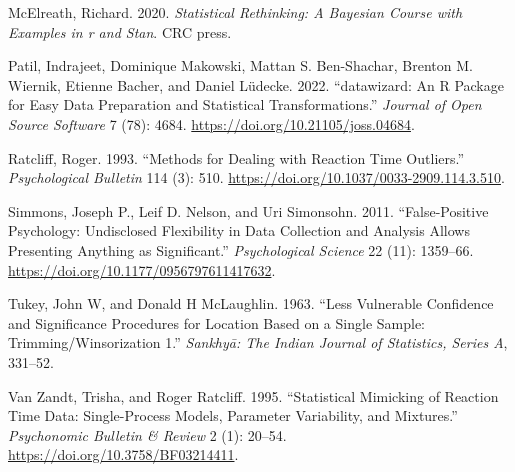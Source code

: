 \documentclass{article}
\newlength{\cslhangindent}
\newlength{\cslentryspacingunit} %
\newenvironment{CSLReferences}[2] %
 {%
  \setlength{\parindent}{0pt}
  \ifodd #1
  \let\oldpar\par
  \def\par{\hangindent=\cslhangindent\oldpar}
  \fi
  \setlength{\parskip}{#2\cslentryspacingunit}
 }%
 {}
\begin{document}
\begin{CSLReferences}{1}{0}
\leavevmode{}%
McElreath, Richard. 2020. \emph{Statistical Rethinking: A Bayesian
Course with Examples in r and Stan}. CRC press.

\leavevmode{}%
Patil, Indrajeet, Dominique Makowski, Mattan S. Ben-Shachar, Brenton M.
Wiernik, Etienne Bacher, and Daniel Lüdecke. 2022. {``{datawizard}: An
{R} Package for Easy Data Preparation and Statistical
Transformations.''} \emph{Journal of Open Source Software} 7 (78): 4684.
\url{https://doi.org/10.21105/joss.04684}.

\leavevmode{}%
Ratcliff, Roger. 1993. {``Methods for Dealing with Reaction Time
Outliers.''} \emph{Psychological Bulletin} 114 (3): 510.
\url{https://doi.org/10.1037/0033-2909.114.3.510}.

\leavevmode{}%
Simmons, Joseph P., Leif D. Nelson, and Uri Simonsohn. 2011.
{``False-Positive Psychology: Undisclosed Flexibility in Data Collection
and Analysis Allows Presenting Anything as Significant.''}
\emph{Psychological Science} 22 (11): 1359--66.
\url{https://doi.org/10.1177/0956797611417632}.

\leavevmode{}%
Tukey, John W, and Donald H McLaughlin. 1963. {``Less Vulnerable
Confidence and Significance Procedures for Location Based on a Single
Sample: Trimming/Winsorization 1.''} \emph{Sankhy{ā}: The Indian Journal
of Statistics, Series A}, 331--52.

\leavevmode{}%
Van Zandt, Trisha, and Roger Ratcliff. 1995. {``Statistical Mimicking of
Reaction Time Data: Single-Process Models, Parameter Variability, and
Mixtures.''} \emph{Psychonomic Bulletin \& Review} 2 (1): 20--54.
\url{https://doi.org/10.3758/BF03214411}.

\end{CSLReferences}



\end{document}

